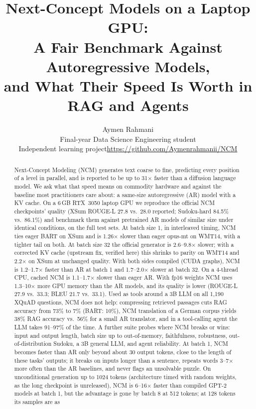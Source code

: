 \documentclass[11pt]{article}
\title{Next-Concept Models on a Laptop GPU:\\
A Fair Benchmark Against Autoregressive Models,\\
and What Their Speed Is Worth in RAG and Agents}
\author{Aymen Rahmani\\\small Final-year Data Science Engineering student\\\small
Independent learning project\quad\url{https://github.com/Aymenrahmanii/NCM}}
\date{}
\begin{document}
\maketitle

\begin{abstract}
Next-Concept Modeling (NCM) generates text coarse to fine, predicting every position of a
level in parallel, and is reported to be up to 31$\times$ faster than a diffusion language
model. We ask what that speed means on commodity hardware and against the baseline most
practitioners care about: a same-size autoregressive (AR) model with a KV cache. On a
6\,GB RTX~3050 laptop GPU we reproduce the official NCM checkpoints' quality (XSum ROUGE-L
27.8 vs.\ 28.0 reported; Sudoku-hard 84.5\% vs.\ 86.1\%) and benchmark them against
pretrained AR models of similar size under identical conditions, on the full test sets. At
batch size 1, in interleaved timing, NCM ties eager BART on XSum and is 1.26$\times$ slower
than eager opus-mt on WMT14, with a tighter tail on both. At batch size 32 the official
generator is 2.6--9.8$\times$ slower; with a corrected KV cache (upstream fix, verified
here) this shrinks to parity on WMT14 and 2.2$\times$ on XSum at unchanged quality. With both
sides compiled (CUDA graphs), NCM is 1.2--1.7$\times$ faster than AR at batch 1 and
1.7--2.0$\times$ slower at batch 32. On a 4-thread CPU,
cached NCM is 1.1--1.7$\times$ slower than eager AR. With fp16 weights NCM uses
1.3--10$\times$ more GPU memory than the AR models, and its quality is lower
(ROUGE-L 27.9 vs.\ 33.3; BLEU 21.7 vs.\ 33.1). Used as tools around a 3B LLM on all 1,190
XQuAD questions, NCM does not help: compressing retrieved passages cuts RAG accuracy from
73\% to 7\% (BART: 10\%), NCM translation of a German corpus yields 38\% RAG accuracy vs.\
56\% for a small AR translator, and in a tool-calling agent the LLM takes 91--97\% of the
time. A further suite probes where NCM breaks or wins: input and output length, batch
size up to out-of-memory, faithfulness, robustness, out-of-distribution Sudoku, a 3B
general LLM, and agent reliability.
At batch 1, NCM becomes faster than AR only beyond about 30 output tokens, close to the
length of these tasks' outputs; it breaks on inputs longer than a sentence, repeats words
3--7$\times$ more often than the AR baselines, and never flags an unsolvable puzzle.
On unconditional generation up to 1024 tokens (architecture timed with random weights, as the
long checkpoint is unreleased), NCM is 6--16$\times$ faster than compiled GPT-2 models at
batch 1, but the advantage is gone by batch 8 at 512 tokens; at 128 tokens its samples are as

\end{abstract}
\end{document}
